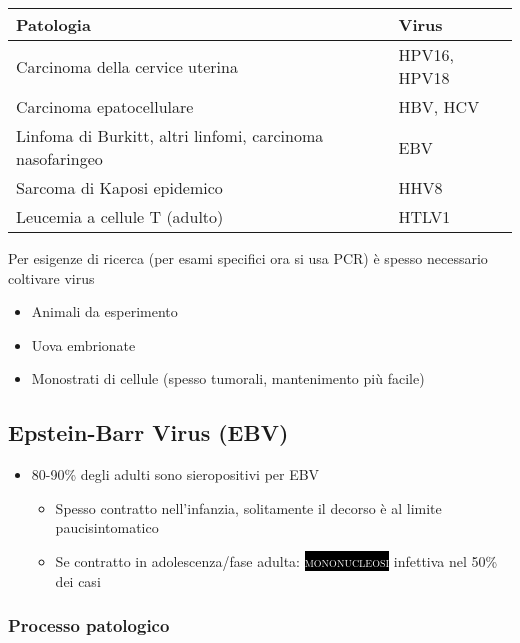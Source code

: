 \documentclass[italian,]{article}
\providecommand{\tightlist}{%
  \setlength{\itemsep}{0pt}\setlength{\parskip}{0pt}}
\newcommand{\pat}[1]{\colorbox{black}{\textcolor{white}{\textsc{#1}}}}
\newcommand{\normalbox}[2]{\begin{tcolorbox}[title=#1]#2\end{tcolorbox}} %
\begin{document}
\begin{longtable}[]{@{}ll@{}}
\toprule
Patologia & Virus\tabularnewline
\midrule
\endhead
Carcinoma della cervice uterina & HPV16, HPV18\tabularnewline
Carcinoma epatocellulare & HBV, HCV\tabularnewline
Linfoma di Burkitt, altri linfomi, carcinoma nasofaringeo &
EBV\tabularnewline
Sarcoma di Kaposi epidemico & HHV8\tabularnewline
Leucemia a cellule T (adulto) & HTLV1\tabularnewline
\bottomrule
\end{longtable}

\normalbox{Coltivazione dei virus}{
Per esigenze di ricerca (per esami specifici ora si usa PCR) è spesso necessario coltivare virus

\begin{itemize}
\tightlist
\item Animali da esperimento
\item Uova embrionate
\item Monostrati di cellule (spesso tumorali, mantenimento più facile)
\end{itemize}
}

\hypertarget{epstein-barr-virus-ebv}{%
\subsection{Epstein-Barr Virus (EBV)}\label{epstein-barr-virus-ebv}}

\begin{itemize}
\tightlist
\item
  80-90\% degli adulti sono sieropositivi per EBV

  \begin{itemize}
  \tightlist
  \item
    Spesso contratto nell'infanzia, solitamente il decorso è al limite
    paucisintomatico
  \item
    Se contratto in adolescenza/fase adulta: \pat{mononucleosi}
    infettiva nel 50\% dei casi
  \end{itemize}
\end{itemize}

\hypertarget{processo-patologico}{%
\subsubsection{Processo patologico}\label{processo-patologico}}
\end{document}
